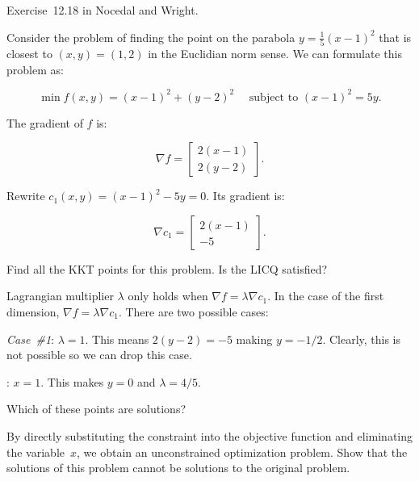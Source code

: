 \begin{problem}\label{prob:05}%
  Exercise~12.18 in Nocedal and Wright.
  
  Consider the problem of finding the point on the parabola $y=\frac{1}{5}(x-1)^{2}$ that is closest to $(x,y)=(1,2)$ in the Euclidian norm sense.  We can formulate this problem as:
  
  \[\min f(x,y)=(x-1)^2  + (y-2)^2 ~~~~~~ \text{subject to } (x-1)^2 = 5y \text{.} \]
\end{problem}

The gradient of $f$ is:

\[\nabla f =  \begin{bmatrix}
                2(x-1)\\
                2(y-2)
              \end{bmatrix} \text{.}\]

\noindent
Rewrite $c_1(x,y)=(x-1)^2-5y=0$.  Its gradient is:

\[\nabla c_1 =  \begin{bmatrix}
                  2(x-1)\\
                  -5
                \end{bmatrix} \text{.}\]

\begin{subproblem}
  Find all the KKT points for this problem.  Is the LICQ satisfied?
\end{subproblem}

Lagrangian multiplier $\lambda$ only holds when $\nabla f = \lambda \nabla c_1$.  In the case of the first dimension, $\nabla f = \lambda \nabla c_1$.  There are two possible cases:

\noindent
\textit{Case~\#1}: $\lambda=1$.  This means $2(y-2)=-5$ making $y=-1/2$.  Clearly, this is not possible so we can drop this case.

\noindent
{}: $x=1$.  This makes $y=0$ and $\lambda=4/5$.

\begin{subproblem}
  Which of these points are solutions?
\end{subproblem}

\begin{subproblem}
  By directly substituting the constraint into the objective function and eliminating the variable~$x$, we obtain an unconstrained optimization problem.  Show that the solutions of this problem cannot be solutions to the original problem.
\end{subproblem}



